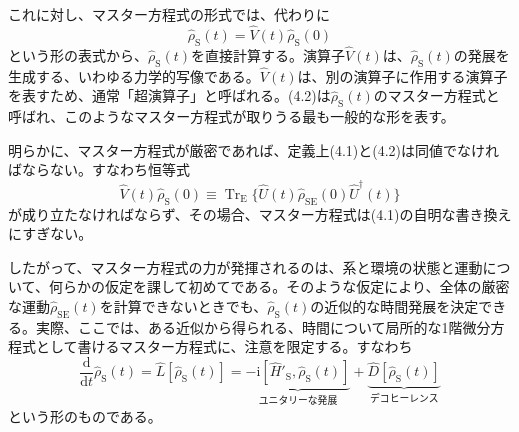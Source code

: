 これに対し、マスター方程式の形式では、代わりに
\begin{equation}
\hat\rho_{\mathrm S}(t)=\hat V(t)\hat\rho_{\mathrm S}(0)
\tag{4.2}
\end{equation}
という形の表式から、$\hat\rho_{\mathrm S}(t)$を直接計算する。演算子$\hat V(t)$は、$\hat\rho_{\mathrm S}(t)$の発展を生成する、いわゆる力学的写像である。$\hat V(t)$は、別の演算子に作用する演算子を表すため、通常「超演算子」と呼ばれる。(4.2)は$\hat\rho_{\mathrm S}(t)$のマスター方程式と呼ばれ、このようなマスター方程式が取りうる最も一般的な形を表す。

明らかに、マスター方程式が厳密であれば、定義上(4.1)と(4.2)は同値でなければならない。すなわち恒等式
\begin{equation}
\hat V(t)\hat\rho_{\mathrm S}(0)\equiv\operatorname{Tr}_{\mathrm E}\{\hat U(t)\hat\rho_{\mathrm{SE}}(0)\hat U^{\dagger}(t)\}
\tag{4.3}
\end{equation}
が成り立たなければならず、その場合、マスター方程式は(4.1)の自明な書き換えにすぎない。

したがって、マスター方程式の力が発揮されるのは、系と環境の状態と運動について、何らかの仮定を課して初めてである。そのような仮定により、全体の厳密な運動$\hat\rho_{\mathrm{SE}}(t)$を計算できないときでも、$\hat\rho_{\mathrm S}(t)$の近似的な時間発展を決定できる。実際、ここでは、ある近似から得られる、時間について局所的な1階微分方程式として書けるマスター方程式に、注意を限定する。すなわち
\begin{equation}
\frac{\mathrm d}{\mathrm dt}\hat\rho_{\mathrm S}(t)=\hat L[\hat\rho_{\mathrm S}(t)]
=\underbrace{-\mathrm i[\hat H'_{\mathrm S},\hat\rho_{\mathrm S}(t)]}_{\text{ユニタリーな発展}}
+\underbrace{\hat D[\hat\rho_{\mathrm S}(t)]}_{\text{デコヒーレンス}}
\tag{4.4}
\end{equation}
という形のものである。

